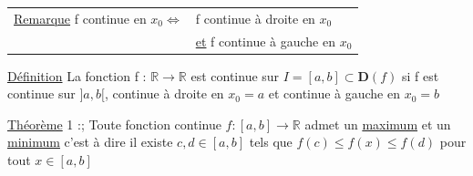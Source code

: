 \documentclass[12pt,a4paper]{article}
\newcommand{\Xo}{\ensuremath{x_0}}
\newcommand{\R}{\ensuremath{\mathbb{R}} }
\newcommand{\rtor}{\ensuremath{\R \to \R} }
\newcommand{\Theoreme}{\underline{Théorème} }
\newcommand{\Remarque}{\underline{Remarque} }
\newcommand{\Definition}{\underline{Définition} }
\begin{document}
{\begin{boite}[0.85]
\begin{tabular}{ll}
\Remarque f continue en \Xo $\Leftrightarrow$ & f continue à droite en \Xo \\
& \underline{et} f continue à gauche en \Xo
\end{tabular}
\end{boite}

\begin{boite}
\Definition La fonction f : \rtor est continue sur $I = [a,b] \subset \mathbf{D}(f)$ si f est continue sur $]a,b[$, continue à droite en $x_0 = a$ et continue à gauche en $x_0 = b$
\end{boite}
\begin{boite}
\Theoreme 1 :; Toute fonction continue $f:[a,b] \to \R$ admet un \underline{maximum} et un \underline{minimum} c'est à dire il existe $c,d \in [a,b]$ tels que $f(c) \leq f(x) \leq f(d)$ pour tout $x \in [a,b]$
\end{boite}

}
\end{document}
